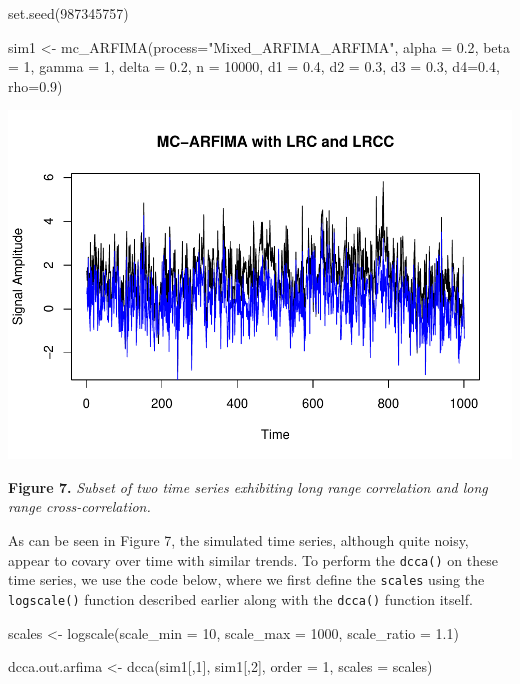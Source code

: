 \documentclass[
  man]{apa6}
\newenvironment{Shaded}{\begin{snugshade}}{\end{snugshade}}
\newcommand{\AttributeTok}[1]{\textcolor[rgb]{0.77,0.63,0.00}{#1}}
\newcommand{\DecValTok}[1]{\textcolor[rgb]{0.00,0.00,0.81}{#1}}
\newcommand{\FloatTok}[1]{\textcolor[rgb]{0.00,0.00,0.81}{#1}}
\newcommand{\FunctionTok}[1]{\textcolor[rgb]{0.00,0.00,0.00}{#1}}
\newcommand{\NormalTok}[1]{#1}
\newcommand{\OtherTok}[1]{\textcolor[rgb]{0.56,0.35,0.01}{#1}}
\newcommand{\StringTok}[1]{\textcolor[rgb]{0.31,0.60,0.02}{#1}}
\begin{document}
\begin{Shaded}
\begin{Highlighting}[]
\FunctionTok{set.seed}\NormalTok{(}\DecValTok{987345757}\NormalTok{)}

\NormalTok{sim1 }\OtherTok{\textless{}{-}} \FunctionTok{mc\_ARFIMA}\NormalTok{(}\AttributeTok{process=}\StringTok{"Mixed\_ARFIMA\_ARFIMA"}\NormalTok{, }\AttributeTok{alpha =} \FloatTok{0.2}\NormalTok{, }
\AttributeTok{beta =} \DecValTok{1}\NormalTok{, }\AttributeTok{gamma =} \DecValTok{1}\NormalTok{, }\AttributeTok{delta =} \FloatTok{0.2}\NormalTok{, }\AttributeTok{n =} \DecValTok{10000}\NormalTok{, }\AttributeTok{d1 =} \FloatTok{0.4}\NormalTok{, }\AttributeTok{d2 =} \FloatTok{0.3}\NormalTok{, }
\AttributeTok{d3 =} \FloatTok{0.3}\NormalTok{, }\AttributeTok{d4=}\FloatTok{0.4}\NormalTok{, }\AttributeTok{rho=}\FloatTok{0.9}\NormalTok{)}
\end{Highlighting}
\end{Shaded}

\includegraphics{fractal_regression_paper_brm_files/figure-latex/unnamed-chunk-15-1.pdf}

\textbf{Figure 7.} \emph{Subset of two time series exhibiting long range
correlation and long range cross-correlation.}

As can be seen in Figure 7, the simulated time series, although quite
noisy, appear to covary over time with similar trends. To perform the
\texttt{dcca()} on these time series, we use the code below, where we first
define the \texttt{scales} using the \texttt{logscale()} function described earlier
along with the \texttt{dcca()} function itself.

\begin{Shaded}
\begin{Highlighting}[]
\NormalTok{scales }\OtherTok{\textless{}{-}} \FunctionTok{logscale}\NormalTok{(}\AttributeTok{scale\_min =} \DecValTok{10}\NormalTok{, }\AttributeTok{scale\_max =} \DecValTok{1000}\NormalTok{, }\AttributeTok{scale\_ratio =} \FloatTok{1.1}\NormalTok{)}

\NormalTok{dcca.out.arfima }\OtherTok{\textless{}{-}} \FunctionTok{dcca}\NormalTok{(sim1[,}\DecValTok{1}\NormalTok{], sim1[,}\DecValTok{2}\NormalTok{], }\AttributeTok{order =} \DecValTok{1}\NormalTok{, }\AttributeTok{scales =}\NormalTok{ scales)}
\end{Highlighting}
\end{Shaded}
\end{document}
